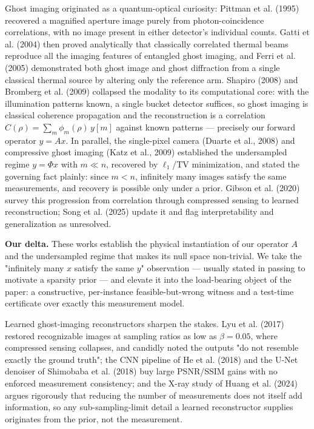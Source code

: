 \documentclass[11pt]{article}
\begin{document}
Ghost imaging originated as a quantum-optical curiosity: Pittman et al. (1995) recovered a magnified aperture image purely from photon-coincidence correlations, with no image present in either detector's individual counts. Gatti et al. (2004) then proved analytically that classically correlated thermal beams reproduce all the imaging features of entangled ghost imaging, and Ferri et al. (2005) demonstrated both ghost image and ghost diffraction from a single classical thermal source by altering only the reference arm. Shapiro (2008) and Bromberg et al. (2009) collapsed the modality to its computational core: with the illumination patterns known, a single bucket detector suffices, so ghost imaging is classical coherence propagation and the reconstruction is a correlation $C(\rho) = \sum_m \phi_m(\rho)\, y[m]$ against known patterns --- precisely our forward operator $y = Ax$. In parallel, the single-pixel camera (Duarte et al., 2008) and compressive ghost imaging (Katz et al., 2009) established the undersampled regime $y = \Phi x$ with $m \ll n$, recovered by $\ell_1$/TV minimization, and stated the governing fact plainly: since $m < n$, infinitely many images satisfy the same measurements, and recovery is possible only under a prior. Gibson et al. (2020) survey this progression from correlation through compressed sensing to learned reconstruction; Song et al. (2025) update it and flag interpretability and generalization as unresolved.

\textbf{Our delta.} These works establish the physical instantiation of our operator $A$ and the undersampled regime that makes its null space non-trivial. We take the "infinitely many $x$ satisfy the same $y$" observation --- usually stated in passing to motivate a sparsity prior --- and elevate it into the load-bearing object of the paper: a constructive, per-instance feasible-but-wrong witness and a test-time certificate over exactly this measurement model.

Learned ghost-imaging reconstructors sharpen the stakes. Lyu et al. (2017) restored recognizable images at sampling ratios as low as $\beta = 0.05$, where compressed sensing collapses, and candidly noted the outputs "do not resemble exactly the ground truth"; the CNN pipeline of He et al. (2018) and the U-Net denoiser of Shimobaba et al. (2018) buy large PSNR/SSIM gains with no enforced measurement consistency; and the X-ray study of Huang et al. (2024) argues rigorously that reducing the number of measurements does not itself add information, so any sub-sampling-limit detail a learned reconstructor supplies originates from the prior, not the measurement.
\end{document}
